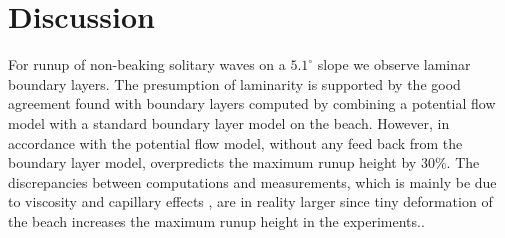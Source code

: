 \documentclass[review]{elsarticle}
\begin{document}
 
 
 
\section{Discussion}
\label{con_rem}

For runup of non-beaking solitary waves on a $5.1^\circ$ slope we 
observe laminar boundary layers. The presumption of laminarity is
 supported by the good agreement found with boundary layers computed 
by combining a potential flow model with a standard boundary layer model on the beach. However, in accordance with \cite{pedersen2013runup} the
potential flow model, without any feed back from the boundary layer model, overpredicts the
maximum runup height by  30\%.  
The discrepancies between computations and measurements, which is mainly be due to viscosity and capillary effects , are in  reality larger since tiny deformation of the beach increases the maximum runup height in the experiments.. 
\end{document}
